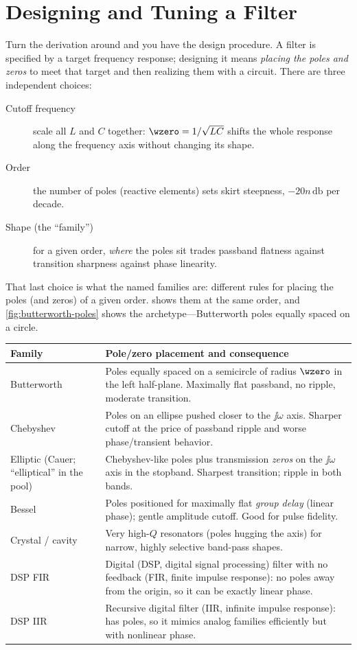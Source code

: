\section{Designing and Tuning a Filter}
Turn the derivation around and you have the design procedure. A filter is
specified by a target frequency response; designing it means \emph{placing the
poles and zeros} to meet that target and then realizing them with a circuit.
There are three independent choices:
\begin{description}
\item[Cutoff frequency] scale all \(L\) and \(C\) together: \(\wzero=1/\sqrt{LC}\)
shifts the whole response along the frequency axis without changing its shape.
\item[Order] the number of poles (reactive elements) sets skirt steepness,
\(-20n\,\si{\decibel}\) per decade.
\item[Shape (the ``family'')] for a given order, \emph{where} the poles sit trades
passband flatness against transition sharpness against phase linearity.
\end{description}

That last choice is what the named families are: different rules for placing the
poles (and zeros) of a given order.  shows them at the
same order, and \cref{fig:butterworth-poles} shows the archetype---Butterworth
poles equally spaced on a circle.

\begin{tabularx}{\textwidth}{@{}L{0.19\textwidth}Y@{}}
\toprule
Family & Pole/zero placement and consequence \\
\midrule
Butterworth & Poles equally spaced on a semicircle of radius \(\wzero\) in the left half-plane. Maximally flat passband, no ripple, moderate transition. \\
Chebyshev & Poles on an ellipse pushed closer to the \(\jj\omega\) axis. Sharper cutoff at the price of passband ripple and worse phase/transient behavior. \\
Elliptic (Cauer; ``elliptical'' in the pool) & Chebyshev-like poles plus transmission \emph{zeros} on the \(\jj\omega\) axis in the stopband. Sharpest transition; ripple in both bands. \\
Bessel & Poles positioned for maximally flat \emph{group delay} (linear phase); gentle amplitude cutoff. Good for pulse fidelity. \\
Crystal / cavity & Very high-\(Q\) resonators (poles hugging the axis) for narrow, highly selective band-pass shapes. \\
DSP FIR & Digital (DSP, digital signal processing) filter with no feedback (FIR, finite impulse response): no poles away from the origin, so it can be exactly linear phase. \\
DSP IIR & Recursive digital filter (IIR, infinite impulse response): has poles, so it mimics analog families efficiently but with nonlinear phase. \\
\bottomrule
\end{tabularx}

